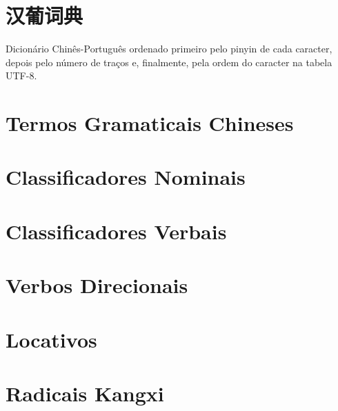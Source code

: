 \documentclass[a4paper,9pt,twoside,openright,book]{memoir}
\begin{document}



\clearpage
\pagestyle{empty}
\tableofcontents

\clearpage
\pagestyle{empty}
\chapter{汉葡词典}

%
%

Dicionário Chinês-Português ordenado primeiro pelo pinyin de cada
caracter, depois pelo número de traços e, finalmente, pela ordem do
caracter na tabela UTF-8.

\clearpage
\pagestyle{dictionary}
\twocolumn























\onecolumn

\clearpage
\pagestyle{plain}
\chapter{Termos Gramaticais Chineses}


\clearpage
\pagestyle{plain}
\chapter{Classificadores Nominais}


\clearpage
\pagestyle{plain}
\chapter{Classificadores Verbais}


\clearpage
\pagestyle{plain}
\chapter{Verbos Direcionais}


\clearpage
\pagestyle{plain}
\chapter{Locativos}


\clearpage
\pagestyle{plain}
\chapter{Radicais Kangxi}

\end{document}
